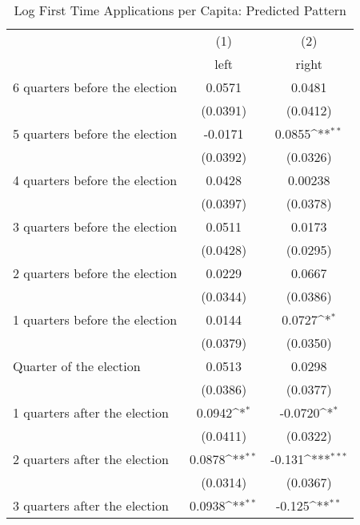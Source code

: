 \begin{table}[htbp]\centering
\def\sym#1{\ifmmode^{#1}\else\(^{#1}\)\fi}
\caption{Log First Time Applications per Capita: Predicted Pattern}
\begin{tabular}{l*{2}{c}}
\hline\hline
                    &\multicolumn{1}{c}{(1)}&\multicolumn{1}{c}{(2)}\\
                    &\multicolumn{1}{c}{left}&\multicolumn{1}{c}{right}\\
\hline
 6 quarters before the election&      0.0571         &      0.0481         \\
                    &    (0.0391)         &    (0.0412)         \\
[1em]
 5 quarters before the election&     -0.0171         &      0.0855\sym{**} \\
                    &    (0.0392)         &    (0.0326)         \\
[1em]
 4 quarters before the election&      0.0428         &     0.00238         \\
                    &    (0.0397)         &    (0.0378)         \\
[1em]
 3 quarters before the election&      0.0511         &      0.0173         \\
                    &    (0.0428)         &    (0.0295)         \\
[1em]
 2 quarters before the election&      0.0229         &      0.0667         \\
                    &    (0.0344)         &    (0.0386)         \\
[1em]
 1 quarters before the election&      0.0144         &      0.0727\sym{*}  \\
                    &    (0.0379)         &    (0.0350)         \\
[1em]
Quarter of the election&      0.0513         &      0.0298         \\
                    &    (0.0386)         &    (0.0377)         \\
[1em]
 1 quarters after the election&      0.0942\sym{*}  &     -0.0720\sym{*}  \\
                    &    (0.0411)         &    (0.0322)         \\
[1em]
 2 quarters after the election&      0.0878\sym{**} &      -0.131\sym{***}\\
                    &    (0.0314)         &    (0.0367)         \\
[1em]
 3 quarters after the election&      0.0938\sym{**} &      -0.125\sym{**} \\

\end{tabular}
\end{table}
